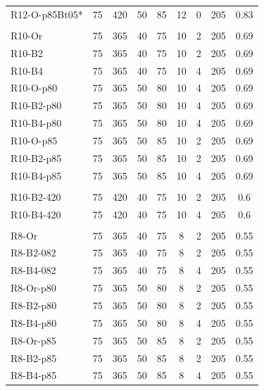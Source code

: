 \begin{table}[]
{\begin{tabular}{@{}lcccccccc@{}}
R12-O-p85Bt05* & 75 & 420 & 50 & 85 & 12 & 0  & 205 & 0.83 \\
               &    &     &    &    &    &    &     &      \\
R10-Or         & 75 & 365 & 40 & 75 & 10 & 2  & 205 & 0.69 \\
R10-B2         & 75 & 365 & 40 & 75 & 10 & 2  & 205 & 0.69 \\
R10-B4         & 75 & 365 & 40 & 75 & 10 & 4  & 205 & 0.69 \\
R10-O-p80   & 75 & 365 & 50 & 80 & 10 & 4  & 205 & 0.69 \\
R10-B2-p80  & 75 & 365 & 50 & 80 & 10 & 4  & 205 & 0.69 \\
R10-B4-p80  & 75 & 365 & 50 & 80 & 10 & 4  & 205 & 0.69 \\
R10-O-p85   & 75 & 365 & 50 & 85 & 10 & 2  & 205 & 0.69 \\
R10-B2-p85  & 75 & 365 & 50 & 85 & 10 & 2  & 205 & 0.69 \\
R10-B4-p85  & 75 & 365 & 50 & 85 & 10 & 4  & 205 & 0.69 \\
               &    &     &    &    &    &    &     &      \\
R10-B2-420     & 75 & 420 & 40 & 75 & 10 & 2  & 205 & 0.6  \\
R10-B4-420     & 75 & 420 & 40 & 75 & 10 & 4  & 205 & 0.6  \\
               &    &     &    &    &    &    &     &      \\
R8-Or          & 75 & 365 & 40 & 75 & 8  & 2  & 205 & 0.55 \\
R8-B2-082      & 75 & 365 & 40 & 75 & 8  & 2  & 205 & 0.55 \\
R8-B4-082      & 75 & 365 & 40 & 75 & 8  & 4  & 205 & 0.55 \\
R8-Or-p80   & 75 & 365 & 50 & 80 & 8  & 2  & 205 & 0.55 \\
R8-B2-p80   & 75 & 365 & 50 & 80 & 8  & 2  & 205 & 0.55 \\
R8-B4-p80   & 75 & 365 & 50 & 80 & 8  & 4  & 205 & 0.55 \\
R8-Or-p85   & 75 & 365 & 50 & 85 & 8  & 2  & 205 & 0.55 \\
R8-B2-p85   & 75 & 365 & 50 & 85 & 8  & 2  & 205 & 0.55 \\
R8-B4-p85   & 75 & 365 & 50 & 85 & 8  & 4  & 205 & 0.55 \\ \bottomrule
\end{tabular}}
\clearpage
\end{table}

